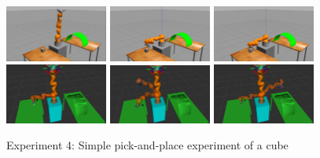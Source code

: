 \begin{center}
\begin{figure}[!htb]
\centering
\includegraphics[width=0.3\textwidth]{images/robot_planner4/robot_planner4_1}
\includegraphics[width=0.3\textwidth]{images/robot_planner4/robot_planner4_3}
\includegraphics[width=0.3\textwidth]{images/robot_planner4/robot_planner4_5}\\
\includegraphics[width=0.3\textwidth]{images/robot_planner4/robot_planner4_6}
\includegraphics[width=0.3\textwidth]{images/robot_planner4/robot_planner4_8}
\includegraphics[width=0.3\textwidth]{images/robot_planner4/robot_planner4_10}\\
\caption{Experiment 4: Simple pick-and-place experiment of a cube}
\end{figure}
\end{center}

